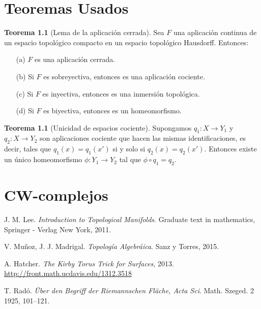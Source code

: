 \documentclass[10pt]{report}
\theoremstyle{definition}
\newtheorem{tma}[defin]{Teorema}
\begin{document}
\appendix
\chapter{Teoremas Usados}

\begin{tma}[Lema de la aplicación cerrada]
\label{teo:aplicac_cerrada}
Sea $F$ una aplicación continua de un espacio topológico compacto en un espacio topológico Hausdorff. Entonces:
\begin{itemize}
\item[(a)]$F$ es una aplicación cerrada.
\item[(b)] Si $F$ es sobreyectiva, entonces es una aplicación cociente.
\item[(c)] Si $F$ es inyectiva, entonces es una inmersión topológica. %
\item[(d)] Si $F$ es biyectiva, entonces es un homeomorfismo.
\end{itemize}
\end{tma}

\begin{tma}[Unicidad de espacios cociente]
\label{teo:unicidad_espacio_cociente}
Supongamos $q_1:X\to Y_1$ y $q_2:X\to Y_2$ son aplicaciones cociente que hacen las mismas identificaciones, es decir, tales que $q_1(x)=q_1(x')$ si y solo si $q_2(x)=q_2(x')$. Entonces existe un único homeomorfismo $\phi:Y_1\to Y_2$ tal que $\phi \circ q_1=q_2$.
\end{tma}

\chapter{CW-complejos}

\begin{thebibliography}{9}

J. M. Lee.
\textit{Introduction to Topological Manifolds}. Graduate text in mathematics, Springer - Verlag New York, 2011.

V. Muñoz, J. J. Madrigal. 
\textit{Topología Algebráica}. Sanz y Torres, 2015.


A. Hatcher.
\textit{The Kirby Torus Trick for Surfaces}, 2013.
\\\url{http://front.math.ucdavis.edu/1312.3518}


T. Radó.
\textit{Über den Begriff der Riemannschen Fläche, Acta Sci}. Math. Szeged. 2 1925,
101–121.


\end{thebibliography}
\end{document}

